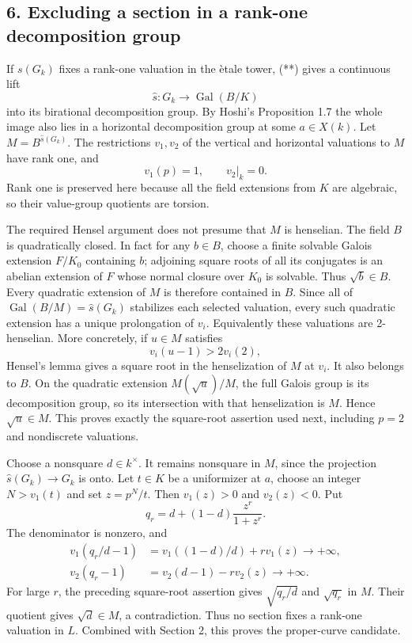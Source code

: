 \subsection*{6. Excluding a section in a rank-one decomposition group}

If $s(G_k)$ fixes a rank-one valuation in the \`etale tower,
(**) gives a continuous lift
\[
             \widehat s:G_k\longrightarrow\operatorname{Gal}(B/K)
\]
into its birational decomposition group.  By Hoshi's Proposition 1.7
the whole image also lies in a horizontal decomposition group at
some $a\in X(k)$.  Let
$M=B^{\widehat s(G_k)}$.  The restrictions $v_1,v_2$ of the vertical
and horizontal valuations to $M$ have rank one, and
\[
                         v_1(p)=1,\qquad v_2|_k=0.
\]
Rank one is preserved here because all the field extensions from
$K$ are algebraic, so their value-group quotients are torsion.

The required Hensel argument does not presume that $M$ is henselian.
The field $B$ is quadratically closed.  In fact for any $b\in B$,
choose a finite solvable Galois extension $F/K_0$ containing $b$;
adjoining square roots of all its conjugates is an abelian extension
of $F$ whose normal closure over $K_0$ is solvable.  Thus $\sqrt b\in B$.
Every quadratic extension of $M$ is therefore contained in $B$.
Since all of $\operatorname{Gal}(B/M)=\widehat s(G_k)$ stabilizes
each selected valuation, every such quadratic extension has a
unique prolongation of $v_i$.  Equivalently these valuations are
2-henselian.  More concretely, if $u\in M$ satisfies
\[
                             v_i(u-1)>2v_i(2),
\]
Hensel's lemma gives a square root in the henselization of $M$ at
$v_i$.  It also belongs to $B$.  On the quadratic extension
$M(\sqrt u)/M$, the full Galois group is its decomposition group,
so its intersection with that henselization is $M$.  Hence
$\sqrt u\in M$.  This proves exactly the square-root assertion
used next, including $p=2$ and nondiscrete valuations.

Choose a nonsquare $d\in k^\times$.  It remains nonsquare in $M$,
since the projection $\widehat s(G_k)\to G_k$ is onto.  Let $t\in K$
be a uniformizer at $a$, choose an integer $N>v_1(t)$ and set
$z=p^N/t$.  Then $v_1(z)>0$ and $v_2(z)<0$.  Put
\[
                    q_r=d+(1-d)\frac{z^r}{1+z^r}.
\]
The denominator is nonzero, and
\[
\begin{aligned}
 v_1(q_r/d-1)&=v_1((1-d)/d)+r v_1(z)\longrightarrow+\infty,\\
 v_2(q_r-1)&=v_2(d-1)-r v_2(z)\longrightarrow+\infty.
\end{aligned}
\]
For large $r$, the preceding square-root assertion gives
$\sqrt{q_r/d}$ and $\sqrt{q_r}$ in $M$.  Their quotient gives
$\sqrt d\in M$, a contradiction.  Thus no section fixes a
rank-one valuation in $L$.  Combined with Section 2, this proves
the proper-curve candidate.

